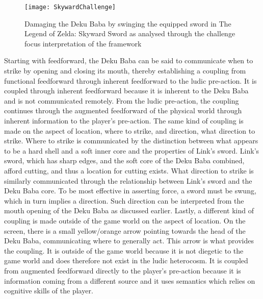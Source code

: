\begin{figure}[h]
  \texttt{[image: SkywardChallenge]}
  \caption{Damaging the Deku Baba by swinging the equipped sword in The Legend of Zelda: Skyward Sword as analysed through the challenge focus interpretation of the framework}
  \label{SkywardChallenge}
\end{figure}

Starting with feedforward, the Deku Baba can be said to communicate when to strike by opening and closing its mouth, thereby establishing a coupling from functional feedforward through inherent feedforward to the ludic pre-action. It is coupled through inherent feedforward because it is inherent to the Deku Baba and is not communicated remotely. From the ludic pre-action, the coupling continues through the augmented feedforward of the physical world through inherent information to the player's pre-action. The same kind of coupling is made on the aspect of location, where to strike, and direction, what direction to strike. Where to strike is communicated by the distinction between what appears to be a hard shell and a soft inner core and the properties of Link's sword. Link's sword, which has sharp edges, and the soft core of the Deku Baba combined, afford cutting, and thus a location for cutting exists. What direction to strike is similarly communicated through the relationship between Link's sword and the Deku Baba core. To be most effective in asserting force, a sword must be swung, which in turn implies a direction. Such direction can be interpreted from the mouth opening of the Deku Baba as discussed earlier. Lastly, a different kind of coupling is made outside of the game world on the aspect of location. On the screen, there is a small yellow/orange arrow pointing towards the head of the Deku Baba, communicating where to generally act. This arrow is what provides the coupling. It is outside of the game world because it is not diegetic to the game world and does therefore not exist in the ludic heterocosm. It is coupled from augmented feedforward directly to the player's pre-action because it is information coming from a different source and it uses semantics which relies on cognitive skills of the player.

